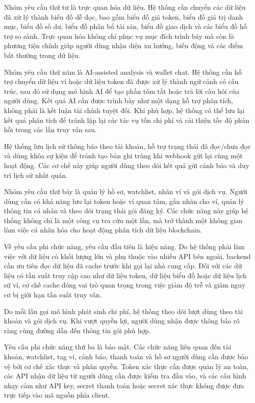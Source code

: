 Nhóm yêu cầu thứ tư là trực quan hóa dữ liệu. Hệ thống cần chuyển các dữ liệu đã xử lý thành biểu đồ dễ đọc, bao gồm biểu đồ giá token, biểu đồ giá trị danh mục, biểu đồ số dư, biểu đồ phân bổ tài sản, biểu đồ giao dịch và các biểu đồ hỗ trợ so sánh. Trực quan hóa không chỉ phục vụ mục đích trình bày mà còn là phương tiện chính giúp người dùng nhận diện xu hướng, biến động và các điểm bất thường trong dữ liệu.

Nhóm yêu cầu thứ năm là AI-assisted analysis và wallet chat. Hệ thống cần hỗ trợ chuyển dữ liệu ví hoặc dữ liệu token đã được xử lý thành ngữ cảnh có cấu trúc, sau đó sử dụng mô hình AI để tạo phần tóm tắt hoặc trả lời câu hỏi của người dùng. Kết quả AI cần được trình bày như một dạng hỗ trợ phân tích, không phải là kết luận tài chính tuyệt đối. Khi phù hợp, hệ thống có thể lưu lại kết quả phân tích để tránh lặp lại các tác vụ tốn chi phí và cải thiện tốc độ phản hồi trong các lần truy vấn sau.

Hệ thống lưu lịch sử thông báo theo tài khoản, hỗ trợ trạng thái đã đọc/chưa đọc và dùng khóa sự kiện để tránh tạo bản ghi trùng khi webhook gửi lại cùng một hoạt động. Các cơ chế này giúp người dùng theo dõi kết quả gửi cảnh báo và duy trì lịch sử nhất quán.

Nhóm yêu cầu thứ bảy là quản lý hồ sơ, watchlist, nhãn ví và gói dịch vụ. Người dùng cần có khả năng lưu lại token hoặc ví quan tâm, gắn nhãn cho ví, quản lý thông tin cá nhân và theo dõi trạng thái gói đăng ký. Các chức năng này giúp hệ thống không chỉ là một công cụ tra cứu một lần, mà trở thành một không gian làm việc cá nhân hóa cho hoạt động phân tích dữ liệu blockchain.

Về yêu cầu phi chức năng, yêu cầu đầu tiên là hiệu năng. Do hệ thống phải làm việc với dữ liệu có khối lượng lớn và phụ thuộc vào nhiều API bên ngoài, backend cần ưu tiên đọc dữ liệu đã cache trước khi gọi lại nhà cung cấp. Đối với các dữ liệu có tần suất truy cập cao như dữ liệu token, dữ liệu biểu đồ hoặc dữ liệu lịch sử ví, cơ chế cache đóng vai trò quan trọng trong việc giảm độ trễ và giảm nguy cơ bị giới hạn tần suất truy vấn.

Do mỗi lần gọi mô hình phát sinh chi phí, hệ thống theo dõi lượt dùng theo tài khoản và gói dịch vụ. Khi vượt quyền lợi, người dùng nhận được thông báo rõ ràng cùng đường dẫn đến thông tin gói phù hợp.

Yêu cầu phi chức năng thứ ba là bảo mật. Các chức năng liên quan đến tài khoản, watchlist, tag ví, cảnh báo, thanh toán và hồ sơ người dùng cần được bảo vệ bởi cơ chế xác thực và phân quyền. Token xác thực cần được quản lý an toàn, các API nhận dữ liệu từ người dùng cần được kiểm tra đầu vào, và các cấu hình nhạy cảm như API key, secret thanh toán hoặc secret xác thực không được đưa trực tiếp vào mã nguồn phía client.

